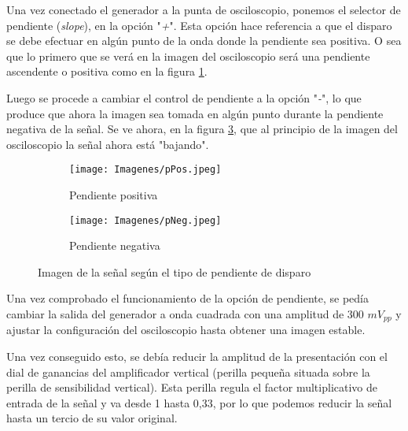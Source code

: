 Una vez conectado el generador a la punta de osciloscopio, ponemos el selector de pendiente (\textit{slope}), en la opción "\textit{+}". Esta opción hace referencia a que el disparo se debe efectuar en algún punto de la onda donde la pendiente sea positiva. O sea que lo primero que se verá en la imagen del osciloscopio será una pendiente ascendente o positiva como en la figura \ref{fig:pendPos}.

Luego se procede a cambiar el control de pendiente a la opción "\textit{-}", lo que produce que ahora la imagen sea tomada en algún punto durante la pendiente negativa de la señal. Se ve ahora, en la figura \ref{fig:pendNeg}, que al principio de la imagen del osciloscopio la señal ahora está "bajando". 



\begin{figure}[H]
        \begin{subfigure}[b]{0.5\textwidth}
        \centering  
        \texttt{[image: Imagenes/pPos.jpeg]}
        \caption{Pendiente positiva}
        \label{fig:pendPos}
    \end{subfigure}
    \hfill
    \begin{subfigure}[b]{0.49\textwidth}
        \centering
        \texttt{[image: Imagenes/pNeg.jpeg]}
        \caption{Pendiente negativa}
        \label{fig:pendNeg}
    \end{subfigure}
    \caption{Imagen de la señal según el tipo de pendiente de disparo}
\end{figure}

Una vez comprobado el funcionamiento de la opción de pendiente, se pedía cambiar la salida del generador a onda cuadrada con una amplitud de 300 $mV_{pp}$ y ajustar la configuración del osciloscopio hasta obtener una imagen estable. 

Una vez conseguido esto, se debía reducir la amplitud de la presentación con el dial de ganancias del amplificador vertical (perilla pequeña situada sobre la perilla de sensibilidad vertical). Esta perilla regula el factor multiplicativo de entrada de la señal y va desde 1 hasta 0,33, por lo que podemos reducir la señal hasta un tercio de su valor original.

